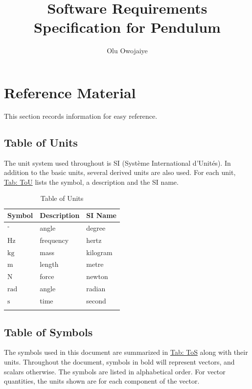 \documentclass[12pt]{article}
\title{Software Requirements Specification for Pendulum}
\author{Olu Owojaiye}
\begin{document}
\maketitle
\tableofcontents
\newpage
\section{Reference Material}
\label{Sec:RefMat}
This section records information for easy reference.

\subsection{Table of Units}
\label{Sec:ToU}
The unit system used throughout is SI (Système International d'Unités). In addition to the basic units, several derived units are also used. For each unit, \hyperref[Table:ToU]{Tab: ToU} lists the symbol, a description and the SI name.

\begin{longtable}{l l l}
\toprule
\textbf{Symbol} & \textbf{Description} & \textbf{SI Name}
\\
\midrule
\endhead
${{}^{\circ}}$ & angle & degree
\\
${\text{Hz}}$ & frequency & hertz
\\
${\text{kg}}$ & mass & kilogram
\\
${\text{m}}$ & length & metre
\\
${\text{N}}$ & force & newton
\\
${\text{rad}}$ & angle & radian
\\
${\text{s}}$ & time & second
\\
\bottomrule
\caption{Table of Units}
\label{Table:ToU}
\end{longtable}
\subsection{Table of Symbols}
\label{Sec:ToS}
The symbols used in this document are summarized in \hyperref[Table:ToS]{Tab: ToS} along with their units. Throughout the document, symbols in bold will represent vectors, and scalars otherwise. The symbols are listed in alphabetical order. For vector quantities, the units shown are for each component of the vector.
\end{document}
